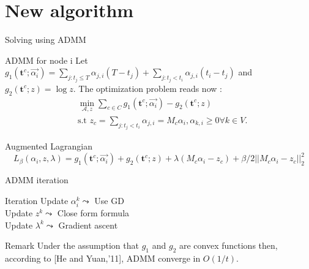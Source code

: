 \documentclass{beamer}
\begin{document}
\section{New algorithm}
\begin{frame}{Solving using ADMM}
    \begin{block}{ADMM for node i}
    Let $g_1(\textbf{t}^c;\Vec{\alpha_i}) = \sum_{j:t_j \leq T} \alpha_{j,i}(T-t_j) + \sum_{j : t_j<t_i} \alpha_{j,i}(t_i-t_j)$ and $g_2(\textbf{t}^c;z) = \log z $. The optimization problem reads now :
    \begin{equation}
        \begin{split}
            &\min_{\mathscr{A},z} \sum_{c\in C}g_1(\textbf{t}^c;\Vec{\alpha_i}) -  g_2(\textbf{t}^c;z)\\
            &\text{s.t } z_c = \sum_{j:t_j<t_i}\alpha_{j,i} = M_c \alpha_i, \alpha_{k,i} \geq 0 \forall k\in V.
        \end{split}
    \end{equation}
    \end{block}
    \begin{block}{Augmented Lagrangian}
    \begin{equation}
        L_\beta(\alpha_i,z,\lambda) = g_1(\textbf{t}^c;\Vec{\alpha_i}) + g_2(\textbf{t}^c;z) + \lambda(M_c \alpha_i - z_c) + \beta/2||M_c\alpha_i -z_c||^2_2
    \end{equation}
    \end{block}
\end{frame}

\begin{frame}{ADMM iteration}
    \begin{block}{Iteration}
    Update $\alpha_i ^k \leadsto$ Use GD\\
    Update $z^k \leadsto $ Close form formula\\
    Update $\lambda^k \leadsto $ Gradient ascent 
   \end{block}
    \begin{block}{Remark}
    Under the assumption that $g_1$ and $g_2$ are convex functions then, according to [He and Yuan,'11]\nocite{ADMM_Convergence}, ADMM converge in $O(1/t)$.
    \end{block}
\end{frame}
\end{document}
